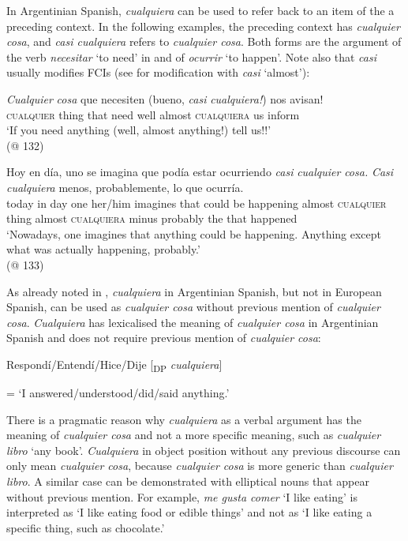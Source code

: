 In Argentinian Spanish, \textit{cualquiera} can be used to refer back to an item of the a preceding context. In the following examples, the preceding context has \textit{cualquier cosa}, and \textit{casi cualquiera} refers to \textit{cualquier cosa}. Both forms are the argument of the verb \textit{necesitar} ‘to need’ in   and of \textit{ocurrir} ‘to happen’. Note also that \textit{casi} usually modifies FCIs (see  for modification with \textit{casi} ‘almost’):

\ea \label{ex:key:229} %
\gll \textit{Cualquier} \textit{cosa} que necesiten (bueno, \textit{casi} \textit{cualquiera!}) nos avisan!\\
    \textsc{cualquier} thing that need well almost \textsc{cualquiera} us inform\\
    \glt ‘If you need anything (well, almost anything!) tell us!!’\\
    (@ 132)
\z

\ea \label{bkm:Ref150786875} %
    \gll Hoy en día, uno se imagina que podía estar ocurriendo \textit{casi} \textit{cualquier} \textit{cosa.} \textit{Casi} \textit{cualquiera} menos, probablemente, lo que ocurría.\\
    today in day one her/him imagines that could be happening almost \textsc{cualquier} thing almost \textsc{cualquiera} minus probably the that happened\\
    \glt ‘Nowadays, one imagines that anything could be happening. Anything except what was actually happening, probably.’\\
    (@ 133)
\z

As already noted in , \textit{cualquiera} in Argentinian Spanish, but not in European Spanish, can be used as \textit{cualquier cosa} without previous mention of \textit{cualquier cosa}. \textit{Cualquiera} has lexicalised the meaning of \textit{cualquier cosa} in Argentinian Spanish and does not require previous mention of \textit{cualquier cosa}:

\ea \label{bkm:Ref150786811} %

Respondí/Entendí/Hice/Dije [\textsubscript{DP} \textit{cualquiera}]

    = ‘I answered/understood/did/said anything.’
\z

There is a pragmatic reason why \textit{cualquiera} as a verbal argument has the meaning of \textit{cualquier cosa} and not a more specific meaning, such as \textit{cualquier libro} ‘any book’. \textit{Cualquiera} in object position without any previous discourse can only mean \textit{cualquier cosa}, because \textit{cualquier cosa} is more generic than \textit{cualquier libro}. A similar case can be demonstrated with elliptical nouns that appear without previous mention. For example, \textit{me gusta comer} ‘I like eating’ is interpreted as ‘I like eating food or edible things’ and not as ‘I like eating a specific thing, such as chocolate.’



